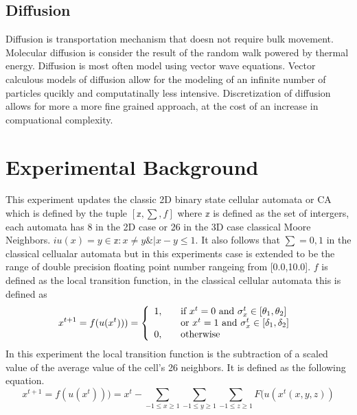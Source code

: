 \documentclass[11pt,twocolumn]{article}
\begin{document}
 \subsection{Diffusion}
 Diffusion is transportation mechanism that doesn not require bulk movement. 
 Molecular diffusion is consider the result of the random walk powered by thermal energy. \cite{appert}
 Diffusion is most often model using vector wave equations. Vector calculous models of diffusion allow for the modeling of an infinite number of particles qucikly and computatinally less intensive.\cite{Tomas1} 
 Discretization of diffusion allows for more a more fine grained approach, at the cost of an increase in compuational complexity.\cite{newman99}
\section{Experimental Background}
This experiment updates the classic 2D binary state cellular automata or CA which is defined by 
the tuple $[ \mathbb{z},\sum,f ]$ where $\mathbb{z}$ is defined as the set of intergers, 
each automata has 8 in the 2D case or 26 in the 3D case classical Moore Neighbors. 
$i u(x)={y \in \mathbb{z}: x \ne y \& |x-y \leq 1} $. It also follows that $\sum ={0,1}$ in the classical cellualar automata but in this experiments case is extended to be the range of double precision floating point number rangeing from [0.0,10.0]. $f$ is defined as the local transition function, in the classical cellular automata this is defined as\cite{watts99}\cite{watts98}
\begin{equation}
x^{t+1}=f(u(x^{t}))) = \left\{ 
  \begin{array}{l l}
    1, & \quad \textrm{if $x^{t} =0$ and $\sigma_{x}^{t} \in [\theta_{1},\theta_{2}]$ }\\
       & \quad \textrm{or $x^{t} = 1$ and $\sigma^{t}_{x} \in [\delta_{1},\delta_{2}]$ }\\
    0, & \quad \textrm{otherwise} \\
  \end{array} \right.
\end{equation}  
In this experiment the local transition function is the subtraction of a scaled value of the average value of the 
cell's 26 neighbors. It is defined as the following equation.
\begin{equation} 
x^{t+1}=f(u(x^{t}))) = x^{t} - \sum_{-1 \leq x \geq 1} \sum_{-1 \leq y \geq 1} \sum_{-1 \leq z \geq 1} F(u(x^{t}(x,y,z))
\end{equation} 
\end{document}
